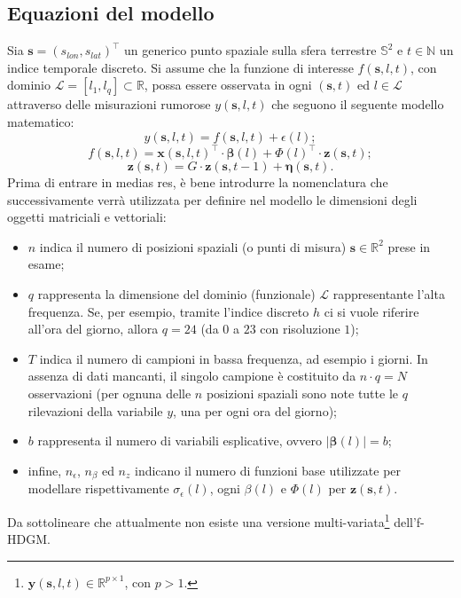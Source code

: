 \subsection[Equazioni del modello]{Equazioni del modello}
\label{equazioni_modello_base}
Sia $\mathbf{s} = (s_{lon}, s_{lat})^\top$ un generico punto spaziale sulla sfera terrestre $\mathbb{S}^2$ e $t\in\mathbb{N}$ un indice temporale discreto. Si assume che la funzione di interesse $f(\mathbf{s}, l, t)$, con dominio $\mathcal{L}=[l_1, l_q]\subset\mathbb{R}$, possa essere osservata in ogni $(\mathbf{s}, t)$ ed $l\in \mathcal{L}$ attraverso delle misurazioni rumorose $y(\mathbf{s}, l, t)$ che seguono il seguente modello matematico:
\begin{equation}
	y(\mathbf{s}, l, t) = f(\mathbf{s}, l, t) + \epsilon(l);
	\label{eq_rumore_uscita}
\end{equation}
\begin{equation}
	f(\mathbf{s}, l, t) = \mathbf{x}(\mathbf{s}, l, t)^\top\cdot\boldsymbol{\beta}(l) + \Phi(l)^\top\cdot\mathbf{z}(\mathbf{s}, t);
	\label{eq_comp_det}
\end{equation}
\begin{equation}
	\mathbf{z}(\mathbf{s}, t) = G\cdot \mathbf{z}(\mathbf{s}, t-1) + \boldsymbol{\eta}(\mathbf{s}, t).
	\label{eq_comp_lat}
\end{equation}
Prima di entrare in medias res, è bene introdurre la nomenclatura che successivamente verrà utilizzata per definire nel modello le dimensioni degli oggetti matriciali e vettoriali:
\begin{itemize}
	\item $n$ indica il numero di posizioni spaziali (o punti di misura) $\mathbf{s}\in\mathbb{R}^2$ prese in esame;
	\item $q$ rappresenta la dimensione del dominio (funzionale) $\mathcal{L}$ rappresentante l'alta frequenza. Se, per esempio, tramite l'indice discreto $h$ ci si vuole riferire all'ora del giorno, allora $q=24$ (da $0$ a $23$ con risoluzione $1$);
	\item $T$ indica il numero di campioni in bassa frequenza, ad esempio i giorni. In assenza di dati mancanti, il singolo campione è costituito da $n\cdot q = N$ osservazioni (per ognuna delle $n$ posizioni spaziali sono note tutte le $q$ rilevazioni della variabile $y$, una per ogni ora del giorno);
	\item $b$ rappresenta il numero di variabili esplicative, ovvero $|\boldsymbol{\beta}(l)| = b$;
	\item infine, $n_\epsilon$, $n_\beta$ ed $n_z$ indicano il numero di funzioni base utilizzate per modellare rispettivamente $\sigma_\epsilon (l)$, ogni $\beta(l)$ e $\Phi(l)$ per $\mathbf{z}(\mathbf{s}, t)$.
\end{itemize}
Da sottolineare che attualmente non esiste una versione multi-variata\footnote{$\mathbf{y}(\mathbf{s}, l, t)\in\mathbb{R}^{p\times 1}$, con $p>1$.} dell'f-HDGM.

